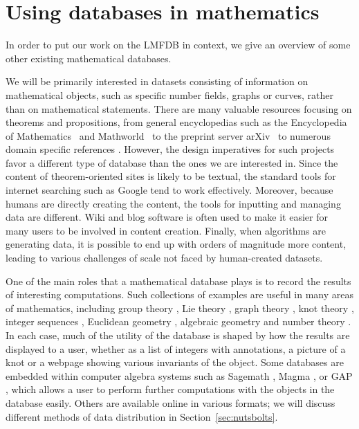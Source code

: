 \documentclass{amsart}
\begin{document}
\section{Using databases in mathematics}

In order to put our work on the LMFDB in context, we give an overview of some other existing mathematical databases.

We will be primarily interested in datasets consisting of information on mathematical objects, such as specific number fields, graphs or curves, rather than on mathematical statements.
There are many valuable resources focusing on theorems and propositions, from general encyclopedias such as the Encyclopedia of Mathematics~\cite{encofmath} and Mathworld~\cite{mathworld} to the preprint server arXiv~\cite{arxiv} to numerous domain specific references \cites{groupprops, graphclasses, complexityzoo}.
However, the design imperatives for such projects favor a different type of database than the ones we are interested in.
Since the content of theorem-oriented sites is likely to be textual, the standard tools for internet searching such as Google tend to work effectively.
Moreover, because humans are directly creating the content, the tools for inputting and managing data are different.
Wiki \cites{cantorsattic, complexityzoo, groupprops, knotatlas} and blog \cite{fanosearch} software is often used to make it easier for many users to be involved in content creation.
Finally, when algorithms are generating data, it is possible to end up with orders of magnitude more content, leading to various challenges of scale not faced by human-created datasets.

One of the main roles that a mathematical database plays is to record the results of interesting computations.
Such collections of examples are useful in many areas of mathematics, including group theory \cites{groupatlas, smallgroups, transgroups, groupnames}, Lie theory \cites{lieatlas, umrk}, graph theory \cite{hog}, knot theory \cite{knotinfo}, integer sequences \cite{oeis}, Euclidean geometry \cite{etc}, algebraic geometry \cite{fanosearch} and number theory \cites{primepages, lmfdb}.
In each case, much of the utility of the database is shaped by how the results are displayed to a user, whether as a list of integers with annotations, a picture of a knot or a webpage showing various invariants of the object.
Some databases \cites{magmadb, smallgroups, transgroups} are embedded within computer algebra systems such as Sagemath \cite{sage}, Magma \cite{magma}, or GAP \cite{gap},
which allows a user to perform further computations with the objects in the database easily.
Others are available online in various formats; we will discuss different methods of data distribution in Section~\ref{sec:nutsbolts}.
\end{document}
